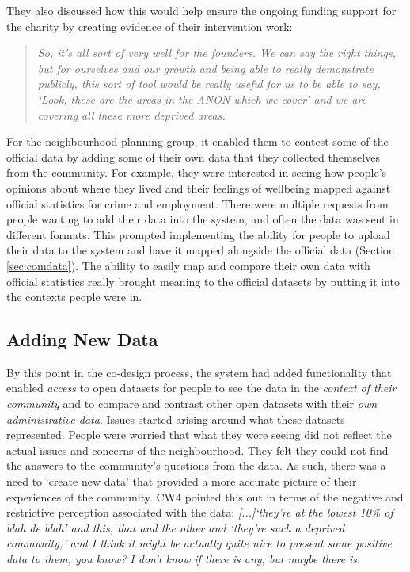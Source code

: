 They also discussed how this would help ensure the ongoing funding support for the charity by creating evidence of their intervention work:
\begin{quote} 
    \textit{So, it's all sort of very well for the founders. We can say the right things, but for ourselves and our growth and being able to really demonstrate publicly, this sort of tool would be really useful for us to be able to say, `Look, these are the areas in the ANON which we cover' and we are covering all these more deprived areas.}
\end{quote}

For the neighbourhood planning group, it enabled them to contest some of the official data by adding some of their own data that they collected themselves from the community. For example, they were interested in seeing how people's opinions about where they lived and their feelings of wellbeing mapped against official statistics for crime and employment. There were multiple requests from people wanting to add their data into the system, and often the data was sent in different formats. This prompted implementing the ability for people to upload their data to the system and have it mapped alongside the official data (Section \ref{sec:comdata}). The ability to easily map and compare their own data with official statistics really brought meaning to the official datasets by putting it into the contexts people were in.

\subsection{Adding New Data}
By this point in the co-design process, the system had added functionality that enabled \textit{access} to open datasets for people to see the data in the \textit{context of their community} and to compare and contrast other open datasets with their \textit{own administrative data}. Issues started arising around what these datasets represented. People were worried that what they were seeing did not reflect the actual issues and concerns of the neighbourhood. They felt they could not find the answers to the community's questions from the data. As such, there was a need to `create new data' that provided a more accurate picture of their experiences of the community. CW4 pointed this out in terms of the negative and restrictive perception associated with the data: \textit{[...]`they're at the lowest 10\% of blah de blah' and this, that and the other and `they're such a deprived community,' and I think it might be actually quite nice to present some positive data to them, you know? I don't know if there is any, but maybe there is.}


